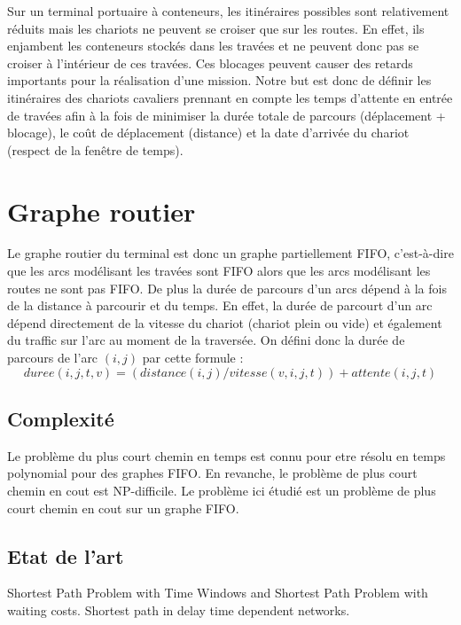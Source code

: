 \documentclass{roadef2011}
\begin{document}
Sur un terminal portuaire à conteneurs, les itinéraires possibles sont relativement réduits mais les chariots ne peuvent se croiser que sur les routes. En effet, ils enjambent les conteneurs stockés dans les travées et ne peuvent donc pas se croiser à l'intérieur de ces travées. Ces blocages peuvent causer des retards importants pour la réalisation d'une mission. Notre but est donc de définir les itinéraires des chariots cavaliers prennant en compte les temps d'attente en entrée de travées afin à la fois de minimiser la durée totale de parcours (déplacement + blocage), le coût de déplacement (distance) et la date d'arrivée du chariot (respect de la fenêtre de temps).

\section{Graphe routier}
Le graphe routier du terminal est donc un graphe partiellement FIFO, c'est-à-dire que les arcs modélisant les travées sont FIFO alors que les arcs modélisant les routes ne sont pas FIFO. De plus la durée de parcours d'un arcs dépend à la fois de la distance à parcourir et du temps. En effet, la durée de parcourt d'un arc dépend directement de la vitesse du chariot (chariot plein ou vide) et également du traffic sur l'arc au moment de la traversée. On défini donc la durée de parcours de l'arc $(i,j)$ par cette formule : 
	\begin{equation}
	  duree(i, j , t, v) = (distance(i,j) / vitesse(v, i, j, t)) + attente(i,j,t)
	\end{equation}

\subsection{Complexit\'e}
Le problème du plus court chemin en temps est connu pour etre résolu en temps polynomial pour des graphes FIFO\cite{Orda1990}.  En revanche, le problème de plus court chemin en cout est NP-difficile\cite{Ahuja2003}. Le problème ici étudié est un problème de plus court chemin en cout sur un graphe FIFO.

\subsection{Etat de l'art}

Shortest Path Problem with Time Windows and Shortest Path Problem with waiting costs. Shortest path in delay time dependent networks.
\end{document}
